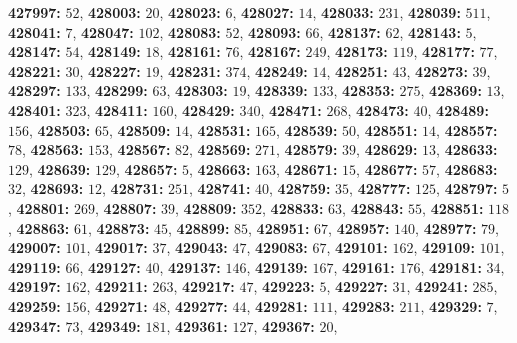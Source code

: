 \textsf{\bfseries 427997:} $52$, \textsf{\bfseries 428003:} $20$, \textsf{\bfseries 428023:} $6$, \textsf{\bfseries 428027:} $14$, \textsf{\bfseries 428033:} $231$, \textsf{\bfseries 428039:} $511$, \textsf{\bfseries 428041:} $7$, \textsf{\bfseries 428047:} $102$, \textsf{\bfseries 428083:} $52$, \textsf{\bfseries 428093:} $66$, \textsf{\bfseries 428137:} $62$, \textsf{\bfseries 428143:} $5$, \textsf{\bfseries 428147:} $54$, \textsf{\bfseries 428149:} $18$, \textsf{\bfseries 428161:} $76$, \textsf{\bfseries 428167:} $249$, \textsf{\bfseries 428173:} $119$, \textsf{\bfseries 428177:} $77$, \textsf{\bfseries 428221:} $30$, \textsf{\bfseries 428227:} $19$, \textsf{\bfseries 428231:} $374$, \textsf{\bfseries 428249:} $14$, \textsf{\bfseries 428251:} $43$, \textsf{\bfseries 428273:} $39$, \textsf{\bfseries 428297:} $133$, \textsf{\bfseries 428299:} $63$, \textsf{\bfseries 428303:} $19$, \textsf{\bfseries 428339:} $133$, \textsf{\bfseries 428353:} $275$, \textsf{\bfseries 428369:} $13$, \textsf{\bfseries 428401:} $323$, \textsf{\bfseries 428411:} $160$, \textsf{\bfseries 428429:} $340$, \textsf{\bfseries 428471:} $268$, \textsf{\bfseries 428473:} $40$, \textsf{\bfseries 428489:} $156$, \textsf{\bfseries 428503:} $65$, \textsf{\bfseries 428509:} $14$, \textsf{\bfseries 428531:} $165$, \textsf{\bfseries 428539:} $50$, \textsf{\bfseries 428551:} $14$, \textsf{\bfseries 428557:} $78$, \textsf{\bfseries 428563:} $153$, \textsf{\bfseries 428567:} $82$, \textsf{\bfseries 428569:} $271$, \textsf{\bfseries 428579:} $39$, \textsf{\bfseries 428629:} $13$, \textsf{\bfseries 428633:} $129$, \textsf{\bfseries 428639:} $129$, \textsf{\bfseries 428657:} $5$, \textsf{\bfseries 428663:} $163$, \textsf{\bfseries 428671:} $15$, \textsf{\bfseries 428677:} $57$, \textsf{\bfseries 428683:} $32$, \textsf{\bfseries 428693:} $12$, \textsf{\bfseries 428731:} $251$, \textsf{\bfseries 428741:} $40$, \textsf{\bfseries 428759:} $35$, \textsf{\bfseries 428777:} $125$, \textsf{\bfseries 428797:} $5$, \textsf{\bfseries 428801:} $269$, \textsf{\bfseries 428807:} $39$, \textsf{\bfseries 428809:} $352$, \textsf{\bfseries 428833:} $63$, \textsf{\bfseries 428843:} $55$, \textsf{\bfseries 428851:} $118$, \textsf{\bfseries 428863:} $61$, \textsf{\bfseries 428873:} $45$, \textsf{\bfseries 428899:} $85$, \textsf{\bfseries 428951:} $67$, \textsf{\bfseries 428957:} $140$, \textsf{\bfseries 428977:} $79$, \textsf{\bfseries 429007:} $101$, \textsf{\bfseries 429017:} $37$, \textsf{\bfseries 429043:} $47$, \textsf{\bfseries 429083:} $67$, \textsf{\bfseries 429101:} $162$, \textsf{\bfseries 429109:} $101$, \textsf{\bfseries 429119:} $66$, \textsf{\bfseries 429127:} $40$, \textsf{\bfseries 429137:} $146$, \textsf{\bfseries 429139:} $167$, \textsf{\bfseries 429161:} $176$, \textsf{\bfseries 429181:} $34$, \textsf{\bfseries 429197:} $162$, \textsf{\bfseries 429211:} $263$, \textsf{\bfseries 429217:} $47$, \textsf{\bfseries 429223:} $5$, \textsf{\bfseries 429227:} $31$, \textsf{\bfseries 429241:} $285$, \textsf{\bfseries 429259:} $156$, \textsf{\bfseries 429271:} $48$, \textsf{\bfseries 429277:} $44$, \textsf{\bfseries 429281:} $111$, \textsf{\bfseries 429283:} $211$, \textsf{\bfseries 429329:} $7$, \textsf{\bfseries 429347:} $73$, \textsf{\bfseries 429349:} $181$, \textsf{\bfseries 429361:} $127$, \textsf{\bfseries 429367:} $20$, 
